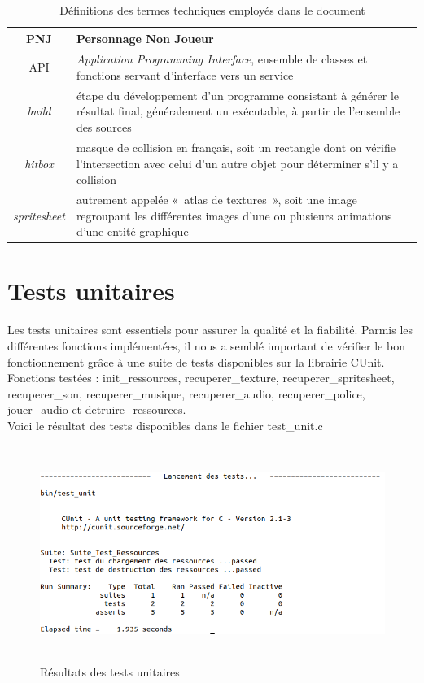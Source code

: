 \documentclass[a4paper,12pt]{article}
\begin{document}
\begin{table}[h]
    \centering
    \begin{tabular}{c p{}}
	\toprule
        PNJ \label{def_pnj} & Personnage Non Joueur \\
	\midrule
	API \label{def_api} & \textit{Application Programming Interface}, ensemble de classes et fonctions servant d’interface vers un service \\
	\midrule
        \textit{build} \label{def_build} & étape du développement d’un programme consistant à générer le résultat final, généralement un exécutable, à partir de l’ensemble des sources \\
	\midrule
        \textit{hitbox} \label{def_hitbox} & masque de collision en français, soit un rectangle dont on vérifie l’intersection avec celui d’un autre objet pour déterminer s’il y a collision\\
	\midrule
        \textit{spritesheet} \label{def_spritesheet} & autrement appelée « atlas de textures », soit une image regroupant les différentes images d’une ou plusieurs animations d’une entité graphique \\
	\bottomrule
    \end{tabular}
    \caption{Définitions des termes techniques employés dans le document}
\end{table}



\section{Tests unitaires}
Les tests unitaires sont essentiels pour assurer la qualité et la fiabilité. Parmis les différentes fonctions implémentées, il nous a semblé important de vérifier le bon fonctionnement grâce à une suite de tests disponibles sur la librairie CUnit.\\
Fonctions testées : init\_ressources, recuperer\_texture, recuperer\_spritesheet, recuperer\_son, recuperer\_musique, recuperer\_audio, recuperer\_police, jouer\_audio et detruire\_ressources.\\
Voici le résultat des tests disponibles dans le fichier test\_unit.c\\

\begin{figure}[h]
	\centering
	\includegraphics[height=7cm]{img/capture_tests.png}
	\caption{Résultats des tests unitaires}
	\label{tests}
\end{figure}
\end{document}
